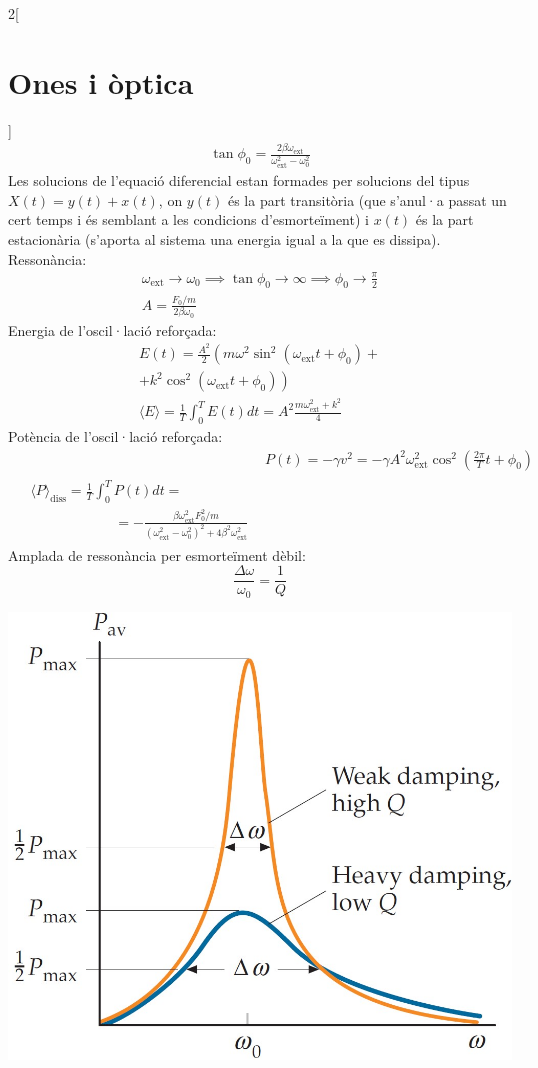 \documentclass[class=article,10pt,crop=false]{standalone}
\begin{document}
\begin{multicols}{2}[\section{Ones i òptica}]
\begin{gather*}
    \tan\phi_0=\frac{2\beta\omega_{\text{ext}}}{\omega_{\text{ext}}^2-\omega_0^2}
\end{gather*}
{\footnotesize Les solucions de l'equació diferencial estan formades per solucions del tipus $X(t)=y(t)+x(t)$, on $y(t)$ és la part transitòria (que s'anul·a passat un cert temps i és semblant a les condicions d'esmorteïment) i $x(t)$ és la part estacionària (s'aporta al sistema una energia igual a la que es dissipa).}\newline
Ressonància:
\begin{gather*}
    \omega_{\text{ext}}\to\omega_0\implies\tan\phi_0\to\infty\implies\phi_0\to\frac{\pi}{2}\\
    A=\frac{F_0/m}{2\beta\omega_0}
\end{gather*}
Energia de l'oscil·lació reforçada:
\begin{multline*}
    E(t)=\frac{A^2}{2}\left(m\omega^2\sin^2(\omega_{\text{ext}}t+\phi_0)+\right.\\\left.+k^2\cos^2(\omega_{\text{ext}}t+\phi_0)\right)\\
    \langle E\rangle=\frac{1}{T}\int_0^TE(t)dt=A^2\frac{m\omega_{\text{ext}}^2+k^2}{4}
\end{multline*}
Potència de l'oscil·lació reforçada:
\begin{align*}
    &P(t)=-\gamma v^2=-\gamma A^2\omega_{\text{ext}}^2\cos^2\left(\frac{2\pi}{T}t+\phi_0\right)\\
    \begin{split}
        &\langle P\rangle_{\text{diss}}=\frac{1}{T}\int_0^TP(t)dt=\\&\qquad\qquad\qquad=-\frac{\beta\omega_\text{ext}^2F_0^2/m}{(\omega_\text{ext}^2-\omega_0^2)^2+4\beta^2\omega_\text{ext}^2}
    \end{split}
\end{align*}
Amplada de ressonància per esmorteïment dèbil:
$$\frac{\Delta\omega}{\omega_0}=\frac{1}{Q}$$
\begin{minipage}{\linewidth}
   \centering
   \includegraphics[width=\linewidth]{Physics/1st/Waves_and_optics/Images/q.jpg}

\end{minipage}
\end{multicols}
\end{document}
